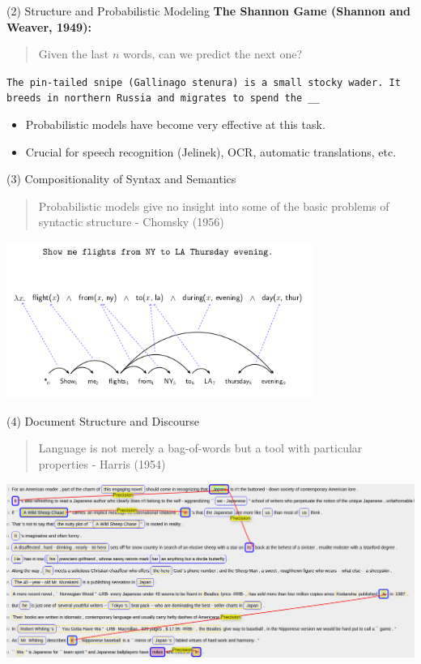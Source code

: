 \documentclass{beamer}
\begin{document}
\begin{frame}{(2) Structure and Probabilistic Modeling }
  \textbf{The Shannon Game (Shannon and Weaver, 1949):}
  \begin{quote}
    Given the last $n$ words, can we predict the next one?
  \end{quote} 
  

  \texttt{The pin-tailed snipe (Gallinago stenura) is a small stocky wader. It breeds in northern Russia and migrates to spend the \_\_ } 


  \begin{itemize}
  \item Probabilistic models have become very effective at this task.
  \item Crucial for speech recognition (Jelinek), OCR, automatic translations, etc. 
  \end{itemize}



\end{frame}

\begin{frame}{(3) Compositionality of Syntax and Semantics}
  \begin{quote}
    Probabilistic models give no insight into some of the basic
    problems of syntactic structure  {\normalfont - Chomsky (1956)}
  \end{quote}
  \begin{center}
    \includegraphics[width=10cm]{syntaxsem}
  \end{center}
\end{frame}


\begin{frame}{(4) Document Structure and Discourse}
  \begin{quote}
    Language is not merely a bag-of-words but a tool with particular
    properties  { - \normalfont Harris (1954)}
  \end{quote}
  \begin{center}
    \includegraphics[width=\textwidth]{cort}
  \end{center}
\end{frame}
\end{document}
